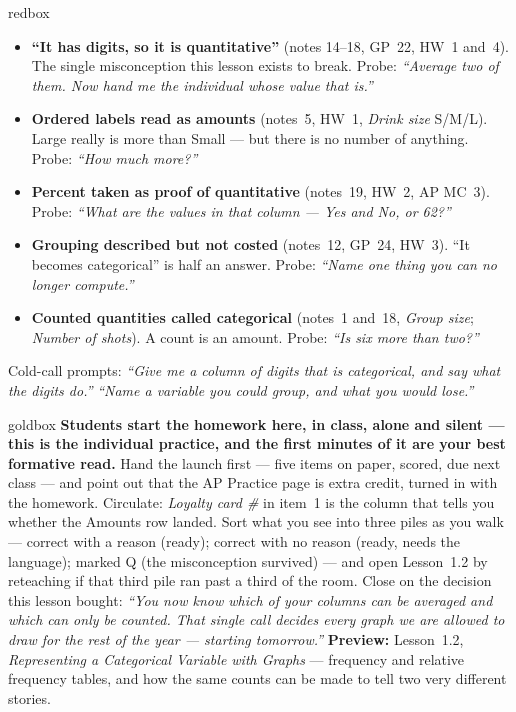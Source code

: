 \documentclass[10pt]{article}
\begin{document}
\boxguard
\begin{skillbox}{redbox}
\begin{itemize}[leftmargin=1.2em, nosep]
  \item \textbf{``It has digits, so it is quantitative''} (notes 14--18, GP~22, HW~1 and~4).
        The single misconception this lesson exists to break. Probe: \emph{``Average two of
        them. Now hand me the individual whose value that is.''}
  \item \textbf{Ordered labels read as amounts} (notes~5, HW~1, \emph{Drink size} S/M/L). Large
        really is more than Small --- but there is no number of anything. Probe: \emph{``How
        much more?''}
  \item \textbf{Percent taken as proof of quantitative} (notes~19, HW~2, AP MC~3). Probe:
        \emph{``What are the values in that column --- Yes and No, or 62?''}
  \item \textbf{Grouping described but not costed} (notes~12, GP~24, HW~3). ``It becomes
        categorical'' is half an answer. Probe: \emph{``Name one thing you can no longer
        compute.''}
  \item \textbf{Counted quantities called categorical} (notes~1 and~18, \emph{Group size};
        \emph{Number of shots}). A count is an amount. Probe: \emph{``Is six more than two?''}
\end{itemize}
Cold-call prompts: \emph{``Give me a column of digits that is categorical, and say what the
digits do.''} \quad \emph{``Name a variable you could group, and what you would lose.''}
\end{skillbox}

\boxguard
\begin{skillbox}{goldbox}
\textbf{Students start the homework here, in class, alone and silent --- this is the individual
practice, and the first minutes of it are your best formative read.} Hand the launch first ---
five items on paper, scored, due next class --- and point out that the AP Practice page is extra credit,
turned in with the homework. Circulate: \emph{Loyalty card \#} in item~1 is the column that tells
you whether the Amounts row landed. Sort what you see into three piles as you walk --- correct with a
reason (ready); correct with no reason (ready, needs the language); marked Q (the misconception
survived) --- and open Lesson~1.2 by reteaching if that third pile ran past a third of the room.
Close on the decision this lesson bought: \emph{``You now know which of your
columns can be averaged and which can only be counted. That single call decides every graph we
are allowed to draw for the rest of the year --- starting tomorrow.''} \textbf{Preview:}
Lesson~1.2, \emph{Representing a Categorical Variable with Graphs} --- frequency and relative
frequency tables, and how the same counts can be made to tell two very different stories.
\end{skillbox}
\end{document}
